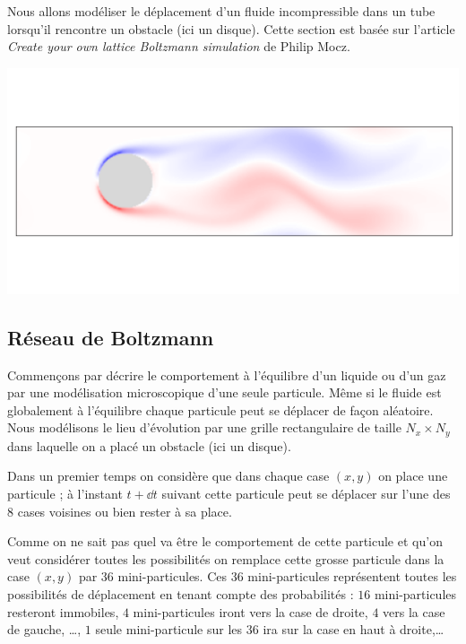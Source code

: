 \documentclass[11pt,class=report,crop=false]{standalone}
\begin{document}
Nous allons modéliser le déplacement d'un fluide incompressible dans un tube lorsqu'il rencontre un obstacle (ici un disque).
Cette section est basée sur l'article \emph{Create your own lattice Boltzmann simulation} de Philip Mocz.
 
\begin{center}	
	\includegraphics[scale=\myscale,scale=0.6,trim={0 2cm 0 3cm},clip]{figures/fluide-vortex-3000}			
\end{center}

\subsection{Réseau de Boltzmann}

Commençons par décrire le comportement à l'équilibre d'un liquide ou d'un gaz par une modélisation microscopique d'une seule particule.
Même si le fluide est globalement à l'équilibre chaque particule peut se déplacer de façon aléatoire.
Nous modélisons le lieu d'évolution par une grille rectangulaire de taille $N_x \times N_y$ dans laquelle on a placé un obstacle (ici un disque).



Dans un premier temps on considère que dans chaque case $(x,y)$ on place une particule ; à l'instant $t + \dd t$ suivant cette particule peut se déplacer sur l'une des 8 cases voisines ou bien rester à sa place. 



Comme on ne sait pas quel va être le comportement de cette particule et qu'on veut considérer toutes les possibilités on remplace cette grosse particule dans la case $(x,y)$ par $36$ mini-particules.
Ces $36$ mini-particules représentent toutes les possibilités de déplacement en tenant compte des probabilités : $16$ mini-particules resteront immobiles, $4$ mini-particules iront vers la case de droite, $4$ vers la case de gauche, \ldots, $1$ seule mini-particule sur les $36$ ira sur la case en haut à droite,\ldots{}
\end{document}
